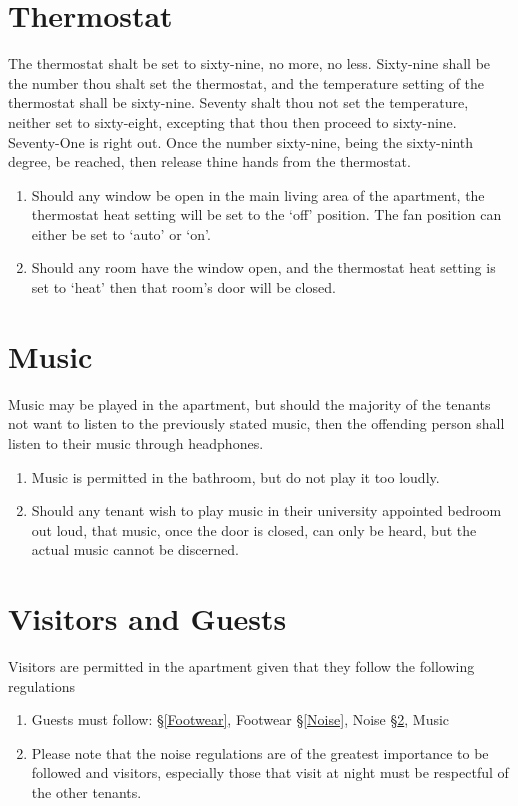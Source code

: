 \documentclass[10pt]{article}
\begin{document}
\section{Thermostat} \label{Thermostat}
The thermostat shalt be set to sixty-nine, no more, no less. Sixty-nine shall be the number thou shalt set the thermostat, and the temperature setting of the thermostat shall be sixty-nine. Seventy shalt thou not set the temperature, neither set to sixty-eight, excepting that thou then proceed to sixty-nine. Seventy-One is right out. Once the number sixty-nine, being the sixty-ninth degree, be reached, then release thine hands from the thermostat.
\begin{enumerate}
	\item Should any window be open in the main living area of the apartment, the thermostat heat setting will be set to the ‘off’ position. The fan position can either be set to ‘auto’ or ‘on’.
	\item Should any room have the window open, and the thermostat heat setting is set to ‘heat’ then that room’s door will be closed.
	
\end{enumerate}

\section{Music} \label{Music}
Music may be played in the apartment, but should the majority of the tenants not want to listen to the previously stated music, then the offending person shall listen to their music through headphones.
\begin{enumerate}
\item Music is permitted in the bathroom, but do not play it too loudly.
\item Should any tenant wish to play music in their university appointed bedroom out loud, that music, once the door is closed, can only be heard, but the actual music cannot be discerned. 
\end{enumerate}

\section{Visitors and Guests} \label{Visitors and Guests}
Visitors are permitted in the apartment given that they follow the following regulations

\begin{enumerate}
	\item Guests must follow:
	\subitem \S \ref{Footwear}, Footwear
	\subitem \S \ref{Noise}, Noise
	\subitem \S \ref{Music}, Music
	\item Please note that the noise regulations are of the greatest importance to be followed and visitors, especially those that visit at night must be respectful of the other tenants.
	
\end{enumerate}
\end{document}
